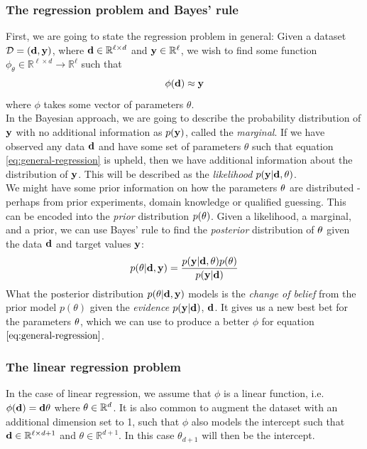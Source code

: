 \subsubsection{The regression problem and Bayes' rule}
First, we are going to state the regression problem in general: 
Given a dataset $\mathcal{D} = (\mathbf{d}, \mathbf{y})$, where $\mathbf{d}\in \mathbb{R}^{\ell \times d}$ and $\mathbf{y} \in \mathbb{R}^{\ell}$, 
we wish to find some function $\phi_\theta \in \mathbb{R}^{\ell \times d} \rightarrow \mathbb{R}^{\ell}$ such that
\begin{equation}
  \label{eq:general-regression}
\phi(\mathbf{d}) \approx \mathbf{y}
\end{equation}
where $\phi$ takes some vector of parameters $\theta$.\\
In the Bayesian approach, we are going to describe the probability distribution of $\mathbf{y}$ with no additional information as $p(\mathbf{y})$, called the \textit{marginal}.
If we have observed any data $\mathbf{d}$ and have some set of parameters $\theta$ such that equation \ref{eq:general-regression} is upheld, then we have additional information about the distribution of $\mathbf{y}$.
This will be described as the \textit{likelihood} $p(\mathbf{y} | \mathbf{d}, \mathbf{\theta})$.\\
We might have some prior information on how the parameters $\mathbf{\theta}$ are distributed - perhaps from prior experiments, domain knowledge or qualified guessing. This can be encoded into the \textit{prior} distribution $p(\mathbf{\theta})$.
Given a likelihood, a marginal, and a prior, we can use Bayes' rule to find the \textit{posterior} distribution of $\mathbf{\theta}$ given the data $\mathbf{d}$ and target values $\mathbf{y}$:
\begin{equation}
  \label{eq:bayes-rule}
  p(\mathbf{\theta} | \mathbf{d}, \mathbf{y}) = \frac{p(\mathbf{y} | \mathbf{d}, \mathbf{\theta})p(\mathbf{\theta})}{p(\mathbf{y| \mathbf{d}})}
\end{equation}
What the posterior distribution $p(\mathbf{\theta} | \mathbf{d}, \mathbf{y})$ models is the \textit{change of belief} from the prior model $p(\theta)$ given the \textit{evidence} $p(\mathbf{y} | \mathbf{d})$, $\mathbf{d}$\cite{krause22}.
It gives us a new best bet for the parameters $\mathbf{\theta}$, which we can use to produce a better $\phi$ for equation $\ref{eq:general-regression}$.
\subsubsection{The linear regression problem}
In the case of linear regression, we assume that $\phi$ is a linear function, i.e. $\phi(\mathbf{d}) = \mathbf{d}\mathbf{\theta}$ where $\mathbf{\theta}\in \mathbb{R}^{d}$. 
It is also common to augment the dataset with an additional dimension set to 1, such that $\phi$ also models the intercept such that $\mathbf{d} \in \mathbb{R}^{\ell \times d + 1}$ and $\theta \in \mathbb{R}^{d + 1}$. In this case $\theta_{d+1}$ will then be the intercept.\\

